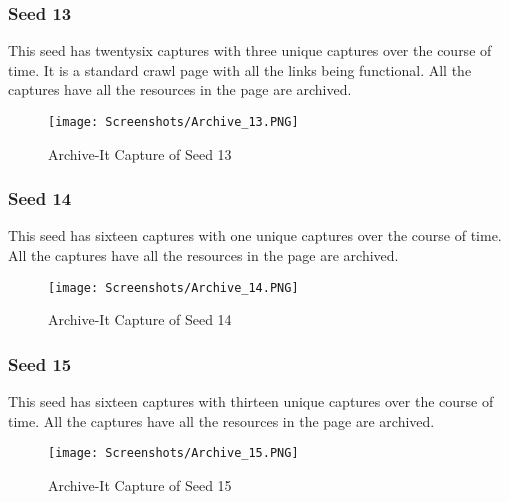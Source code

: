 \documentclass[11pt,journal,compsoc,onecolumn]{IEEEtran}
\begin{document}
\subsubsection{Seed 13}
This seed has twentysix captures with three unique captures over the course of time. It is a standard crawl page with all the links being functional. All the captures have all the resources in the page are archived.
 \begin{figure}[ht] 
  \centering
  \texttt{[image: Screenshots/Archive\_13.PNG]}
  \caption{Archive-It Capture of Seed 13}
  \label{fig:36}
\end{figure}
\subsubsection{Seed 14}
This seed has sixteen captures with one unique captures over the course of time. All the captures have all the resources in the page are archived.
 \begin{figure}[ht] 
  \centering
  \texttt{[image: Screenshots/Archive\_14.PNG]}
  \caption{Archive-It Capture of Seed 14}
  \label{fig:37}
\end{figure}
\subsubsection{Seed 15}
This seed has sixteen captures with thirteen unique captures over the course of time. All the captures have all the resources in the page are archived.
 \begin{figure}[ht] 
  \centering
  \texttt{[image: Screenshots/Archive\_15.PNG]}
  \caption{Archive-It Capture of Seed 15}
  \label{fig:38}
\end{figure}
\end{document}
